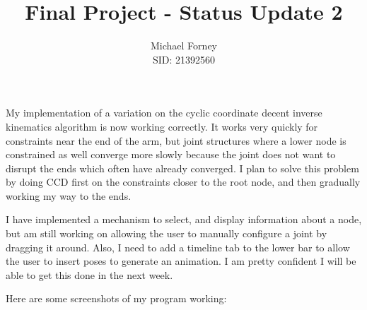 \documentclass{article}
\title{Final Project - Status Update 2}
\author{Michael Forney \\ SID: 21392560}
\begin{document}
    \maketitle
    \doublespacing

    My implementation of a variation on the cyclic coordinate decent inverse
    kinematics algorithm is now working correctly. It works very quickly for
    constraints near the end of the arm, but joint structures where a lower
    node is constrained as well converge more slowly because the joint does not
    want to disrupt the ends which often have already converged. I plan to
    solve this problem by doing CCD first on the constraints closer to the root
    node, and then gradually working my way to the ends.

    I have implemented a mechanism to select, and display information about a
    node, but am still working on allowing the user to manually configure a
    joint by dragging it around. Also, I need to add a timeline tab to the
    lower bar to allow the user to insert poses to generate an animation. I am
    pretty confident I will be able to get this done in the next week.

    Here are some screenshots of my program working:
\end{document}
